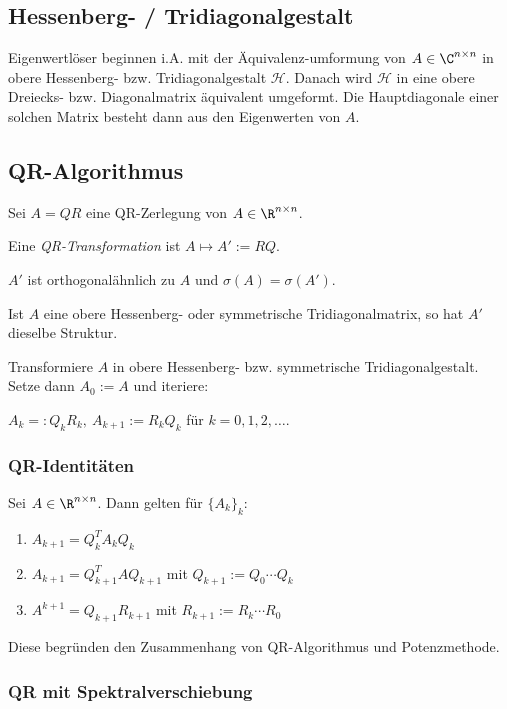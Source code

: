 \subsection*{Hessenberg- / Tridiagonalgestalt}

Eigenwertlöser beginnen i.A. mit der Äquivalenz-umformung von $A \in \C^{n \times n}$ in obere Hessenberg- bzw. Tridiagonalgestalt $\mathcal{H}$. Danach wird $\mathcal{H}$ in eine obere Dreiecks- bzw. Diagonalmatrix äquivalent umgeformt. Die Hauptdiagonale einer solchen Matrix besteht dann aus den Eigenwerten von $A$.

\subsection*{QR-Algorithmus}

Sei $A = QR$ eine QR-Zerlegung von $A \in \R^{n \times n}$.

Eine \emph{QR-Transformation} ist $A \mapsto A':=RQ$.

\spacing

$A'$ ist orthogonalähnlich zu $A$ und $\sigma(A) = \sigma(A')$.

Ist $A$ eine obere Hessenberg- oder symmetrische Tridiagonalmatrix, so hat $A'$ dieselbe Struktur.

\spacing

Transformiere $A$ in obere Hessenberg- bzw. symmetrische Tridiagonalgestalt. Setze dann $A_0 := A$ und iteriere:

$A_k =: Q_kR_k, \ A_{k+1} := R_kQ_k$ für $k = 0,1,2,\dots$.

\subsubsection*{QR-Identitäten}

Sei $A \in \R^{n \times n}$. Dann gelten für $\{A_k\}_k$:

\begin{enumerate}[label=(\alph*)]
	\item $A_{k+1} = Q_k^T A_k Q_k$
	\item $A_{k+1} = Q_{k+1}^T A Q_{k+1}$ mit $Q_{k+1} := Q_0 \cdots Q_k$
	\item $A^{k+1} = Q_{k+1} R_{k+1}$ mit $R_{k+1} := R_k \cdots R_0$
\end{enumerate}

Diese begründen den Zusammenhang von QR-Algorithmus und Potenzmethode.

\subsubsection*{QR mit Spektralverschiebung}

